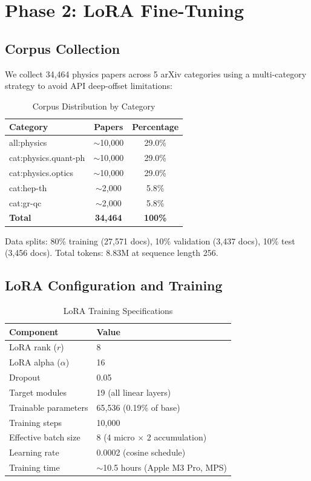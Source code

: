 \documentclass[11pt,a4paper]{article}
\begin{document}
\section{Phase 2: LoRA Fine-Tuning}

\subsection{Corpus Collection}

We collect 34,464 physics papers across 5 arXiv categories using a multi-category strategy to avoid API deep-offset limitations:

\begin{table}[h]
\centering
\caption{Corpus Distribution by Category}
\begin{tabular}{lcc}
\toprule
\textbf{Category} & \textbf{Papers} & \textbf{Percentage} \\
\midrule
all:physics & $\sim$10,000 & 29.0\% \\
cat:physics.quant-ph & $\sim$10,000 & 29.0\% \\
cat:physics.optics & $\sim$10,000 & 29.0\% \\
cat:hep-th & $\sim$2,000 & 5.8\% \\
cat:gr-qc & $\sim$2,000 & 5.8\% \\
\midrule
\textbf{Total} & \textbf{34,464} & \textbf{100\%} \\
\bottomrule
\end{tabular}
\end{table}

Data splits: 80\% training (27,571 docs), 10\% validation (3,437 docs), 10\% test (3,456 docs). Total tokens: 8.83M at sequence length 256.

\subsection{LoRA Configuration and Training}

\begin{table}[h]
\centering
\caption{LoRA Training Specifications}
\begin{tabular}{ll}
\toprule
\textbf{Component} & \textbf{Value} \\
\midrule
LoRA rank ($r$) & 8 \\
LoRA alpha ($\alpha$) & 16 \\
Dropout & 0.05 \\
Target modules & 19 (all linear layers) \\
Trainable parameters & 65,536 (0.19\% of base) \\
Training steps & 10,000 \\
Effective batch size & 8 (4 micro $\times$ 2 accumulation) \\
Learning rate & 0.0002 (cosine schedule) \\
Training time & $\sim$10.5 hours (Apple M3 Pro, MPS) \\
\bottomrule
\end{tabular}
\end{table}
\end{document}
